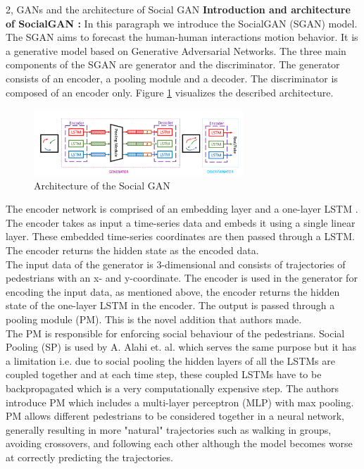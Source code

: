 \documentclass[10pt,a4paper]{article}
\begin{document}
\begin{task}{2, GANs and the architecture of Social GAN}
    \textbf{Introduction and architecture of SocialGAN \cite{gupta2018social}:} \bigbreak
    In this paragraph we introduce the SocialGAN (SGAN) model. The SGAN aims to forecast the human-human interactions motion behavior. It is a generative model based on Generative Adversarial Networks. The three main components of the SGAN are generator and the discriminator. The generator consists of an encoder, a pooling module and a decoder. The discriminator is composed of an encoder only. Figure \ref{fig:sgan_architecture} visualizes the described architecture.
    \begin{figure}[H]
        \centering
        \includegraphics[width=0.7\textwidth]{pictures/SGAN_architecture.png}
        \caption{Architecture of the Social GAN \cite{gupta2018social}}
        \label{fig:sgan_architecture}
    \end{figure}
    The encoder network is comprised of an embedding layer and a one-layer LSTM \cite{lstm}. The encoder takes as input a time-series data and embeds it using a single linear layer. These embedded time-series coordinates are then passed through a LSTM. The encoder returns the hidden state as the encoded data. \\
    The input data of the generator is 3-dimensional and consists of trajectories of pedestrians with an x- and y-coordinate. The encoder is used in the generator for encoding the input data, as mentioned above, the encoder returns the hidden state of the one-layer LSTM in the encoder. The output is passed through a pooling module (PM). This is the novel addition that authors made.\\
    The PM is responsible for enforcing social behaviour of the pedestrians. Social Pooling (SP)\cite{social_pooling} is used by A. Alahi et. al. which serves the same purpose but it has a limitation i.e. due to social pooling the hidden layers of all the LSTMs are coupled together and at each time step, these coupled LSTMs have to be backpropagated which is a very computationally expensive step. The authors introduce PM which includes a multi-layer perceptron (MLP) with max pooling. PM allows different pedestrians to be considered together in a neural network, generally resulting in more "natural" trajectories such as walking in groups, avoiding crossovers, and following each other although the model becomes worse at correctly predicting the trajectories. \\

\end{task}
\end{document}
